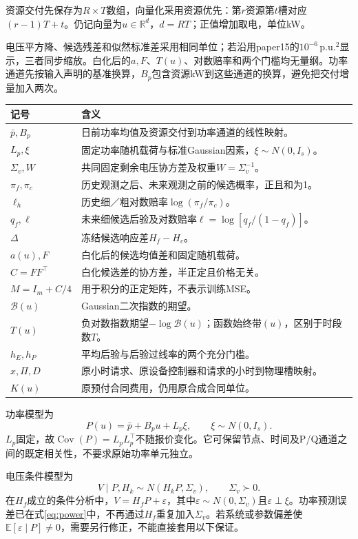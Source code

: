 \documentclass[UTF8,11pt,a4paper,fontset=fandol]{ctexart}
\newcommand{\E}{\mathbb E}
\newcommand{\Cov}{\operatorname{Cov}}
\newcommand{\R}{\mathbb R}
\numberwithin{equation}{section}
\begin{document}
资源交付先保存为$R\times T$数组，向量化采用资源优先：第$r$资源第$t$槽对应$(r-1)T+t$。仍记向量为$u\in\R^d$，$d=RT$；正值增加取电，单位kW。

电压平方降、候选残差和似然标准差采用相同单位；若沿用paper15的$10^{-6}\,\mathrm{p.u.}^2$显示，三者同步缩放。白化后的$a,F$、$T(u)$、对数赔率和两个门槛均无量纲。功率通道先按输入声明的基准换算，$B_p$包含资源kW到这些通道的换算，避免把交付增量加入两次。

\begin{longtable}{p{30mm}p{\dimexpr\linewidth-30mm-4\tabcolsep\relax}}
\toprule 记号&含义\\\midrule\endhead
$\bar p,B_p$&日前功率均值及资源交付到功率通道的线性映射。\\
$L_p,\xi$&固定功率随机载荷与标准Gaussian因素，$\xi\sim N(0,I_s)$。\\
$\Sigma_v,W$&共同固定剩余电压协方差及权重$W=\Sigma_v^{-1}$。\\
$\pi_f,\pi_c$&历史观测之后、未来观测之前的候选概率，正且和为1。\\
$\ell_h$&历史细／粗对数赔率$\log(\pi_f/\pi_c)$。\\
$q_f,\ell$&未来细候选后验及对数赔率$\ell=\log[q_f/(1-q_f)]$。\\
$\Delta$&冻结候选响应差$H_f-H_c$。\\
$a(u),F$&白化后的候选均值差和固定随机载荷。\\
$C=FF^\top$&白化候选差的协方差，半正定且价格无关。\\
$M=I_m+C/4$&用于积分的正定矩阵，不表示训练MSE。\\
$\mathcal B(u)$&Gaussian二次指数的期望。\\
$T(u)$&负对数指数期望$-\log\mathcal B(u)$；函数始终带$(u)$，区别于时段数$T$。\\
$h_E,h_P$&平均后验与后验过线率的两个充分门槛。\\
$x,\Pi,D$&原小时请求、原设备控制器和请求的小时到物理槽映射。\\
$K(u)$&原预付合同费用，仍用原合成合同单位。\\\bottomrule
\end{longtable}

功率模型为
\begin{equation}
P(u)=\bar p+B_pu+L_p\xi,\qquad \xi\sim N(0,I_s).
\label{eq:power}
\end{equation}
$L_p$固定，故$\Cov(P)=L_pL_p^\top$不随报价变化。它可保留节点、时间及P/Q通道之间的既定相关性，不要求原始功率单元独立。

电压条件模型为
\begin{equation}
V\mid P,H_k\sim N(H_kP,\Sigma_v),\qquad\Sigma_v\succ0.
\label{eq:voltage}
\end{equation}
在$H_f$成立的条件分析中，$V=H_fP+\varepsilon$，其中$\varepsilon\sim N(0,\Sigma_v)$且$\varepsilon\perp\xi$。功率预测误差已在式\eqref{eq:power}中，不再通过$H_f$重复加入$\Sigma_v$。若系统或参数偏差使$\E[\varepsilon\mid P]\ne0$，需要另行修正，不能直接套用以下保证。
\end{document}
